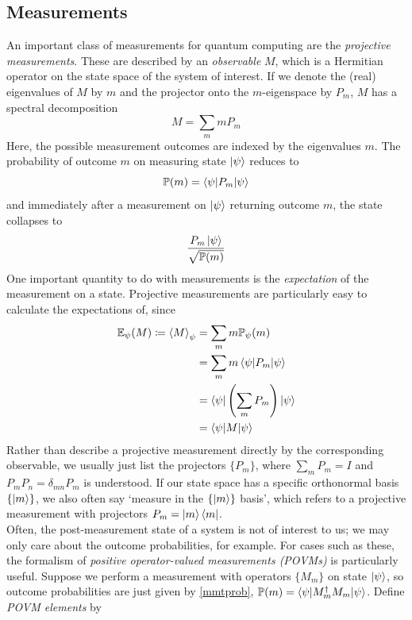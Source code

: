\documentclass[12pt,a4paper]{report}
\newcommand{\ketbra}[2]{\ket{#1}\bra{#2}}
\newcommand{\ketbras}[1]{\ketbra{#1}{#1}}
\begin{document}
\subsection{Measurements}
An important class of measurements for quantum computing are the \textit{projective measurements}. These are described by an \textit{observable} $M$, which is a Hermitian operator on the state space of the system of interest. If we denote the (real) eigenvalues of $M$ by $m$ and the projector onto the $m$-eigenspace by $P_{m}$, $M$ has a spectral decomposition
\begin{equation}
	M=\sum_{m}mP_{m}
\end{equation}
Here, the possible measurement outcomes are indexed by the eigenvalues $m$. The probability of outcome $m$ on measuring state $\ket{\psi}$ reduces to
\begin{equation}
	\mathbb{P}(m)=\braket{\psi|P_{m}|\psi}
\end{equation}
and immediately after a measurement on $\ket{\psi}$ returning outcome $m$, the state collapses to
\begin{equation}
	\frac{P_{m}\ket{\psi}}{\sqrt{\mathbb{P}(m)}}
\end{equation}
One important quantity to do with measurements is the \textit{expectation} of the measurement on a state. Projective measurements are particularly easy to calculate the expectations of, since
\begin{equation}
	\begin{aligned}
		\mathbb{E}_{\psi}(M)\coloneqq\braket{M}_{\psi}&=\sum_{m}m\mathbb{P}_{\psi}(m)\\&=\sum_{m}m\braket{\psi|P_{m}|\psi}\\&=\bra{\psi}\left(\sum_{m}P_{m}\right)\ket{\psi}\\&=\braket{\psi|M|\psi}
	\end{aligned}
\end{equation}
Rather than describe a projective measurement directly by the corresponding observable, we usually just list the projectors $\{P_{m}\}$, where $\sum_{m}P_{m}=I$ and $P_{m}P_{n}=\delta_{mn}P_{m}$ is understood. If our state space has a specific orthonormal basis $\{\ket{m}\}$, we also often say `measure in the $\{\ket{m}\}$ basis', which refers to a projective measurement with projectors $P_{m}=\ketbras{m}$.\\
Often, the post-measurement state of a system is not of interest to us; we may only care about the outcome probabilities, for example. For cases such as these, the formalism of \textit{positive operator-valued measurements (POVMs)} is particularly useful. Suppose we perform a measurement with operators $\{M_{m}\}$ on state $\ket{\psi}$, so outcome probabilities are just given by \ref{mmtprob}, $\mathbb{P}(m)=\braket{\psi|M_{m}^{\dagger}M_{m}|\psi}$. Define \textit{POVM elements} by
\end{document}
